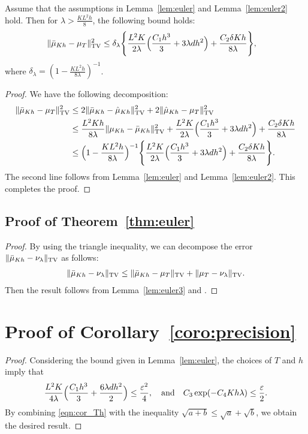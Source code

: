 \begin{lemma}
\label{lem:euler3}
Assume that the assumptions in Lemma~\ref{lem:euler} and Lemma~\ref{lem:euler2} hold. Then for $\lambda > \frac{KL^2h}{8}$, the following bound holds:
\begin{align}
\|\bar{\mu}_{Kh} - \mu_{T} \|_{\textnormal{TV}}^2 &\leq \delta_\lambda \Biggl\{ \frac{L^2 K}{2\lambda} \Bigl( \frac{C_1 h^3}{3} + 3 \lambda d h^2 \Bigr) + \frac{C_2 \delta K h}{8\lambda} \Biggr\},
\end{align}
where $\delta_\lambda = (1 -\frac{KL^2h}{8\lambda})^{-1} $.
\end{lemma}
%
\begin{proof}
We have the following decomposition:
\begin{align}
\|\bar{\mu}_{Kh} - \mu_{T} \|_{\textnormal{TV}}^2 &\leq 2 \|\bar{\mu}_{Kh} - \hat{\mu}_{Kh} \|_{\textnormal{TV}}^2 + 2\|\hat{\mu}_{Kh} - \mu_{T} \|_{\textnormal{TV}}^2 \\
&\leq  \frac{L^2 K h}{8 \lambda}  \|\mu_{Kh} - \bar{\mu}_{Kh} \|_{\textnormal{TV}}^2 + \frac{L^2 K}{2\lambda} \Bigl( \frac{C_1 h^3}{3} + 3 \lambda d h^2 \Bigr) + \frac{C_2 \delta K h}{8\lambda} \\ 
&\leq \Bigl(1 -\frac{KL^2h}{8\lambda} \Bigr)^{-1} \Biggl\{ \frac{L^2 K}{2\lambda} \Bigl( \frac{C_1 h^3}{3} + 3 \lambda d h^2 \Bigr) + \frac{C_2 \delta K h}{8\lambda} \Biggr\}.
\end{align}
The second line follows from Lemma~\ref{lem:euler} and Lemma~\ref{lem:euler2}. This completes the proof.
\end{proof}

\subsection{Proof of Theorem~\ref{thm:euler}}
%
\begin{proof}
By using the triangle inequality, we can decompose the error $\| \bar{\mu}_{Kh} - \nu_\lambda \|_{\textnormal{TV}}$ as follows:
\begin{align}
\| \bar{\mu}_{Kh} - \nu_\lambda \|_{\textnormal{TV}}\leq \| \bar{\mu}_{Kh} - \mu_{T} \|_{\textnormal{TV}} + \| \mu_{T} - \nu_\lambda \|_{\textnormal{TV}}.
\end{align}
Then the result follows from Lemma~\ref{lem:euler3} and .

\end{proof}

\section{Proof of Corollary~\ref{coro:precision}}
\begin{proof}
Considering the bound given in Lemma~\ref{lem:euler}, the choices of $T$ and $h$ imply that
\begin{align}
\frac{L^2 K}{4\lambda} \Bigl( \frac{C_1 h^3}{3} + \frac{6 \lambda d h^2}{2} \Bigr) \leq \frac{\varepsilon^2}{4}, \quad \text{and} \quad C_3 \exp(-C_4 Kh \lambda) \leq \frac{\varepsilon}{2}. \label{eqn:cor_Th}
\end{align}
By combining \eqref{eqn:cor_Th} with the inequality $\sqrt{a+b}\leq \sqrt{a} + \sqrt{b}$, we obtain the desired result. 
\end{proof}

